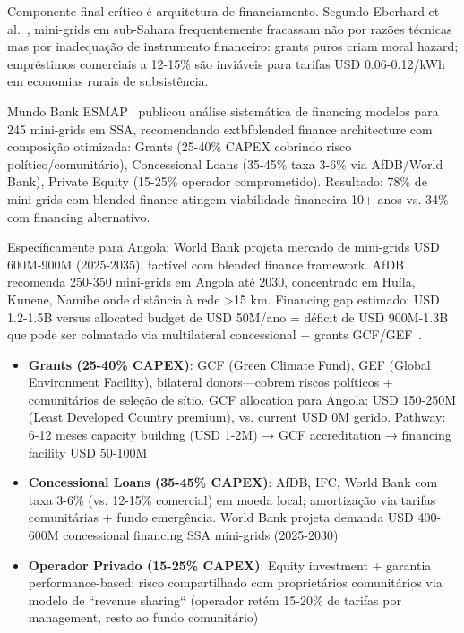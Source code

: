 \documentclass[12pt, a4paper]{article}
\begin{document}
Componente final crítico é arquitetura de financiamento. Segundo Eberhard et al.~\citep{Eberhard2020}, mini-grids em sub-Sahara frequentemente fracassam não por razões técnicas mas por inadequação de instrumento financeiro: grants puros criam moral hazard; empréstimos comerciais a 12-15\% são inviáveis para tarifas USD 0.06-0.12/kWh em economias rurais de subsistência. 

Mundo Bank ESMAP~\citep{WorldBankESMAP2024} publicou análise sistemática de financing modelos para 245 mini-grids em SSA, recomendando 	extbf{blended finance architecture} com composição otimizada: Grants (25-40\% CAPEX cobrindo risco político/comunitário), Concessional Loans (35-45\% taxa 3-6\% via AfDB/World Bank), Private Equity (15-25\% operador comprometido). Resultado: 78\% de mini-grids com blended finance atingem viabilidade financeira 10+ anos vs. 34\% com financing alternativo. 

Específicamente para Angola: World Bank projeta mercado de mini-grids USD 600M-900M (2025-2035), factível com blended finance framework. AfDB~\citep{AfDB2024AngolaAssessment} recomenda 250-350 mini-grids em Angola até 2030, concentrado em Huíla, Kunene, Namibe onde distância à rede >15 km. Financing gap estimado: USD 1.2-1.5B versus allocated budget de USD 50M/ano = déficit de USD 900M-1.3B que pode ser colmatado via multilateral concessional + grants GCF/GEF~\citep{GCFMiniGridFramework2024}.

\begin{itemize}
\item \textbf{Grants (25-40\% CAPEX)}: GCF (Green Climate Fund), GEF (Global Environment Facility), bilateral donors—cobrem riscos políticos + comunitários de seleção de sítio. GCF allocation para Angola: USD 150-250M (Least Developed Country premium), vs. current USD 0M gerido. Pathway: 6-12 meses capacity building (USD 1-2M) → GCF accreditation → financing facility USD 50-100M
\item \textbf{Concessional Loans (35-45\% CAPEX)}: AfDB, IFC, World Bank com taxa 3-6\% (vs. 12-15\% comercial) em moeda local; amortização via tarifas comunitárias + fundo emergência. World Bank projeta demanda USD 400-600M concessional financing SSA mini-grids (2025-2030)
\item \textbf{Operador Privado (15-25\% CAPEX)}: Equity investment + garantia performance-based; risco compartilhado com proprietários comunitários via modelo de ``revenue sharing`` (operador retém 15-20\% de tarifas por management, resto ao fundo comunitário)

\end{itemize}
\end{document}
